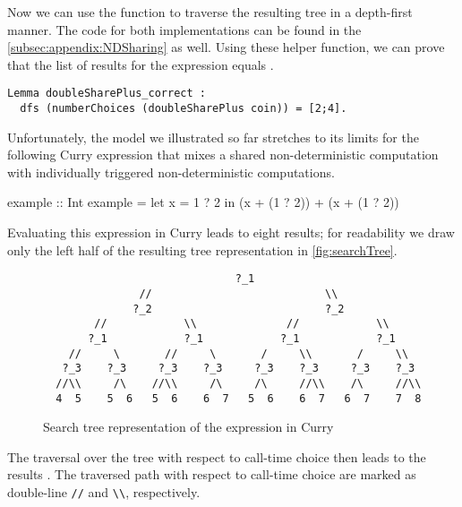 Now we can use the function  to traverse the resulting tree in a depth-first manner.
The code for both implementations can be found in the \autoref{subsec:appendix:NDSharing} as well.
Using these helper function, we can prove that the list of results for the expression  equals \cinl{[2;4]}.

\begin{verbatim}
Lemma doubleSharePlus_correct :
  dfs (numberChoices (doubleSharePlus coin)) = [2;4].
\end{verbatim}

Unfortunately, the model we illustrated so far stretches to its limits for the following Curry expression that mixes a shared non-deterministic computation with individually triggered non-deterministic computations.

\begin{curry}
example :: Int
example = let x = 1 ? 2 in (x + (1 ? 2)) + (x + (1 ? 2))  
\end{curry}

Evaluating this expression in Curry leads to eight results; for readability we draw only the left half of the resulting tree representation in \autoref{fig:searchTree}.

\begin{figure}[h]
\centering
\begin{BVerbatim}
                              ?_1
               //                           \\
              ?_2                           ?_2
        //            \\              //            \\
       ?_1            ?_1            ?_1            ?_1
    //     \       //     \       /     \\       /     \\
   ?_3    ?_3     ?_3    ?_3     ?_3    ?_3     ?_3    ?_3
  //\\     /\    //\\     /\     /\     //\\    /\     //\\
  4  5    5  6   5  6    6  7   5  6    6  7   6  7    7  8
\end{BVerbatim}
\caption{Search tree representation of the expression 
  in Curry}
\label{fig:searchTree}
\end{figure}

The traversal over the tree with respect to call-time choice then leads to the results .
The traversed path with respect to call-time choice are marked as double-line \verb|//| and \verb|\\|, respectively.

